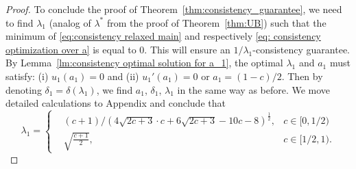 \begin{proof}
To conclude the proof of Theorem~\ref{thm:consistency_guarantee}, we need to find $\lambda_1$ (analog of $\lambda^*$ from the proof of Theorem~\ref{thm:UB}) such that the minimum of \eqref{eq:consistency relaxed main} and respectively \eqref{eq: consistency optimization over a} is equal to $0$. This will ensure an $1/\lambda_1$-consistency guarantee. By Lemma~\ref{lm:consistency optimal solution for a_1}, the optimal $\lambda_1$ and $a_1$ must satisfy: (i) $u_1(a_1)=0$ and (ii) $u_1'(a_1)=0$ or $a_1=(1-c)/2$. Then by denoting $\delta_1=\delta(\lambda_1)$, we find  $a_1$, $\delta_1$, $\lambda_1$ in the same way as before. We move detailed calculations to Appendix and conclude that
\begin{equation*}
    \lambda_1=\left\{
    \begin{aligned}
    &(c+1)/\left(4\sqrt{2c+3}\cdot c+6\sqrt{2c+3}-10c-8\right)^{\frac{1}{2}},&c\in[0,1/2)\\
    &\sqrt{\frac{c+1}{2}},&c\in[1/2,1).
    \end{aligned}
    \right.
\end{equation*}
\end{proof}

